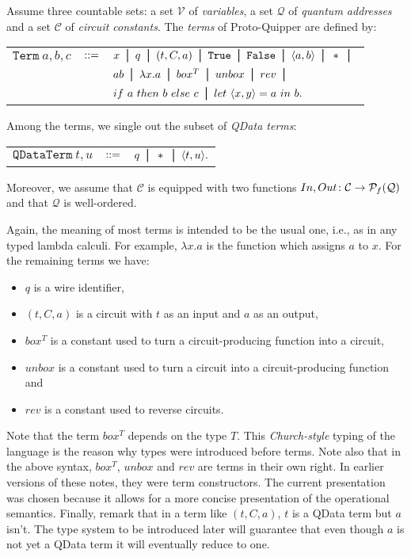 \documentclass{article}
\begin{document}
\begin{definition}
Assume three countable sets: a set $\mathcal{V}$ of \emph{variables}, a set 
$\mathcal{Q}$ of \emph{quantum addresses} and a set $\mathcal{C}$ of 
\emph{circuit constants}. The \emph{terms} of Proto-Quipper are defined by:
\begin{center}
\begin{tabular}{rcl}
$\mathtt{Term}~a,b,c$ & $::=$ & $x \bor q \bor (t,C,a) \bor \true \bor \false 
  \bor \p{a,b} \bor * \bor$ \\[0.05in]
& & $ab \bor \lambda x.a \bor box^T \bor unbox \bor rev \bor $\\[0.05in]
& & $if ~a~ then ~b~ else ~c \bor let ~\atuple{x,y}=a~ in ~b.$
\end{tabular}
\end{center}
Among the terms, we single out the subset of \emph{QData terms}:
\begin{center}
\begin{tabular}{rcl}
$\mathtt{QDataTerm}~t,u$ & $::=$ & $q \bor * \bor \atuple{t,u}.$
\end{tabular}
\end{center}
Moreover, we assume that $\mathcal{C}$ is equipped with two functions 
$In,Out\colon \mathcal{C}\to\mathcal{P}_f(\mathcal{Q})$ and that $\mathcal{Q}$ 
is well-ordered.
\end{definition}

Again, the meaning of most terms is intended to be the usual one, i.e., as in any typed 
lambda calculi. For example, $\lambda x.a$ is the function which assigns $a$ to $x$. 
For the remaining terms we have:
\begin{itemize}
  \item $q$ is a wire identifier,
  \item $(t,C,a)$ is a circuit with $t$ as an input and $a$ as an output,
  \item $box^T$ is a constant used to turn a circuit-producing function into a circuit,
  \item $unbox$ is a constant used to turn a circuit into a circuit-producing function and
  \item $rev$ is a constant used to reverse circuits.
\end{itemize}

Note that the term $box^T$ depends on the type $T$. This \emph{Church-style} typing of the 
language is the reason why types were introduced before terms. Note also that in the above 
syntax, $box^T$, $unbox$ and $rev$ are terms in their own right. In earlier versions of 
these notes, they were term constructors. The current presentation  was chosen because it 
allows for a more concise presentation of the operational semantics. Finally, remark that 
in a term like $(t,C,a)$, $t$ is a QData term but $a$ isn't. The type system to 
be introduced later will guarantee that even though $a$ is not yet a QData term 
it will eventually reduce to one.
\end{document}
